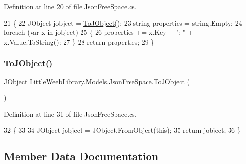 Definition at line 20 of file Json\+Free\+Space.\+cs.


\begin{DoxyCode}
21         \{
22             JObject jobject = \mbox{\hyperlink{class_little_weeb_library_1_1_models_1_1_json_free_space_a5deaf058a148e647128b1fca6f9fc722}{ToJObject}}();
23             \textcolor{keywordtype}{string} properties = \textcolor{keywordtype}{string}.Empty;
24             \textcolor{keywordflow}{foreach} (var x \textcolor{keywordflow}{in} jobject)
25             \{
26                 properties += x.Key + \textcolor{stringliteral}{": "} + x.Value.ToString();
27             \}
28             \textcolor{keywordflow}{return} properties;
29         \}
\end{DoxyCode}
\mbox{\label{class_little_weeb_library_1_1_models_1_1_json_free_space_a5deaf058a148e647128b1fca6f9fc722}} 
\subsubsection{\texorpdfstring{To\+J\+Object()}{ToJObject()}}
{\footnotesize\ttfamily J\+Object Little\+Weeb\+Library.\+Models.\+Json\+Free\+Space.\+To\+J\+Object (\begin{DoxyParamCaption}{ }\end{DoxyParamCaption})}



Definition at line 31 of file Json\+Free\+Space.\+cs.


\begin{DoxyCode}
32         \{
33 
34             JObject jobject = JObject.FromObject(\textcolor{keyword}{this});
35             \textcolor{keywordflow}{return} jobject;
36         \}
\end{DoxyCode}


\subsection{Member Data Documentation}
\mbox{\label{class_little_weeb_library_1_1_models_1_1_json_free_space_a22620db3979c7d52ee764555c29a940c}} 
